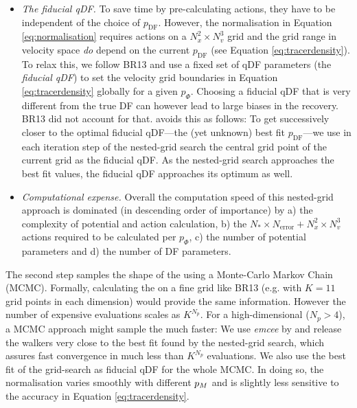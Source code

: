 \begin{itemize}
\item \emph{The fiducial qDF.} To save time by pre-calculating actions, they have to be independent of the choice of $p_\text{DF}$. However, the normalisation in Equation \ref{eq:normalisation} requires actions on a $N_x^2 \times N_v^3$ grid and the grid range in velocity space \emph{do} depend on the current $p_\text{DF}$ (see Equation \ref{eq:tracerdensity}). To relax this, we follow BR13 and use a fixed set of qDF parameters (the \emph{fiducial qDF}) to set the velocity grid boundaries in Equation \ref{eq:tracerdensity} globally for a given $p_\Phi$. Choosing a fiducial qDF that is very different from the true DF can however lead to large biases in the \pmodel{} recovery. BR13 did not account for that. \RM{} avoids this as follows: To get successively closer to the optimal fiducial qDF---the (yet unknown) best fit $p_\text{DF}$---we use in each iteration step of the nested-grid search the central grid point of the current \pmodel{} grid as the fiducial qDF.  As the nested-grid search approaches the best fit values, the fiducial qDF approaches its optimum as well. 

\item \emph{Computational expense.} Overall the computation speed of this nested-grid approach is dominated (in descending order of importance) by a) the complexity of potential and action calculation, b) the $N_* \times N_\text{error} + N_x^2 \times N_v^3$ actions required to be calculated per $p_\Phi$, c) the number of potential parameters and d) the number of DF parameters.
\end{itemize}

The second step samples the shape of the \pdf{} using a Monte-Carlo Markov Chain (MCMC). Formally, calculating the \pdf{} on a fine grid like BR13 (e.g. with $K=11$ grid points in each dimension) would provide the same information. However the number of expensive \pdf{} evaluations scales as $K^{N_p}$. For a high-dimensional \pmodel{} ($N_p>4$), a MCMC approach might sample the \pdf{} much faster: We use \emph{emcee} by \citet{2013PASP..125..306F} and release the walkers very close to the best fit \pmodel{} found by the nested-grid search, which assures fast convergence in much less than $K^{N_p}$ \pdf{} evaluations. We also use the best fit \pmodel{} of the grid-search as fiducial qDF for the whole MCMC. In doing so, the normalisation varies smoothly with different $p_M{}$ and is slightly less sensitive to the accuracy in Equation \ref{eq:tracerdensity}.